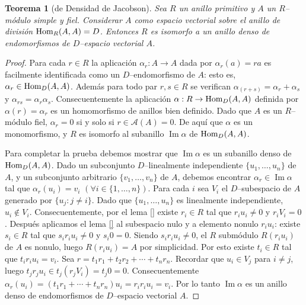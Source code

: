 \documentclass{report}
\newcommand{\Hom}{\textnormal{Hom}}
\DeclareMathOperator{\image}{\text{Im}}
\newtheorem{theorem}{Teorema}
\begin{document}
  \begin{theorem}[de Densidad de Jacobson]
    Sea \(R\) un anillo primitivo y \(A\) un \(R\)--módulo simple y fiel.
    Considerar \(A\) como espacio vectorial sobre el anillo de división \(\Hom_R(A, A) = D\).
    Entonces \(R\) es isomorfo a un anillo denso de endomorfismos de \(D\)--espacio vectorial \(A\).
  \end{theorem}
  \begin{proof}
    Para cada \(r \in R\) la aplicación \(\alpha_r : A \rightarrow A\) dada por \(\alpha_r(a) = r a\) es facilmente identificada como un \(D\)--endomorfismo de \(A\): esto es, \(\alpha_r \in \Hom_D(A, A)\).
    Además para todo par \(r, s \in R\) se verifican \(\alpha_{(r + s)} = \alpha_r + \alpha_s\) y \(\alpha_{r s} = \alpha_r \alpha_s\).
    Consecuentemente la aplicación \(\alpha : R \rightarrow \Hom_D(A, A)\) definida por \(\alpha(r) = \alpha_r\) es un homomorfismo de anillos bien definido.
    Dado que \(A\) es un \(R\)--módulo fiel, \(\alpha_r = 0\) si y solo si \(r \in \mathcal{A}(A) = 0\).
    De aquí que \(\alpha\) es un monomorfismo, y \(R\) es isomorfo al subanillo \(\image \alpha\) de \(\Hom_D(A, A)\).

    Para completar la prueba debemos mostrar que \(\image \alpha\) es un subanillo denso de \(\Hom_D(A, A)\).
    Dado un subconjunto \(D\)--linealmente independiente \(\{u_1, \dots, u_n\}\) de \(A\), y un subconjunto arbitrario \(\{v_1, \dots, v_n\}\) de \(A\), debemos encontrar \(\alpha_r \in \image \alpha\) tal que \(\alpha_r(u_i) = v_i\) \((\forall i \in \{1, \dots, n\})\).
    Para cada \(i\) sea \(V_i\) el \(D\)--subespacio de \(A\) generado por \(\{u_j : j \neq i\}\).
    Dado que \(\{u_1, \dots, u_n\}\) es linealmente independiente, \(u_i \notin V_i\).
    Consecuentemente, por el lema \ref{} existe \(r_i \in R\) tal que \(r_i u_i \neq 0\) y \(r_i V_i = 0\).
    Después aplicamos el lema \ref{} al subespacio nulo y a elemento nonulo \(r_i u_i\):
    existe \(s_i \in R\) tal que \(s_i r_i u_i \neq 0\) y \(s_i 0 = 0\).
    Siendo \(s_i r_i u_i \neq 0\), el \(R\) submódulo \(R (r_i u_i)\) de \(A\) es nonulo, luego \(R(r_i u_i) = A\) por simplicidad.
    Por esto existe \(t_i \in R\) tal que \(t_i r_i u_i = v_i\).
    Sea \(r = t_1 r_1 + t_2 r_2 + \cdots + t_n r_n\).
    Recordar que \(u_i \in V_j\) para \(i \neq j\), luego \(t_j r_j u_i \in t_j (r_j V_i) = t_j 0 = 0\).
    Consecuentemente \(\alpha_r(u_i) = (t_1 r_1 + \cdots + t_n r_n) u_i = r_i r_i u_i = v_i\).
    Por lo tanto \(\image \alpha\) es un anillo denso de endomorfismos de \(D\)--espacio vectorial \(A\).
  \end{proof}
\end{document}
